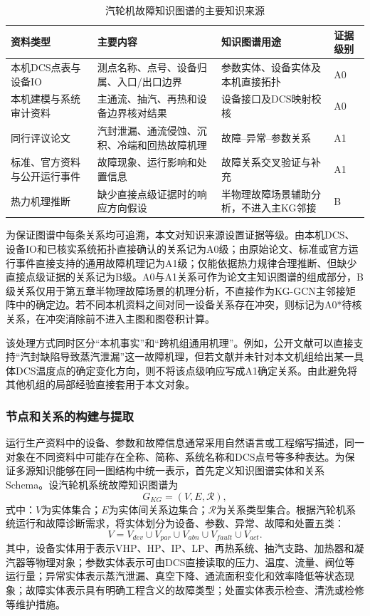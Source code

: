 \begin{table}[htbp]
    \centering
    \caption{汽轮机故障知识图谱的主要知识来源}
    \label{tab:kg_sources_v5}
    \begin{tabular}{p{3.3cm}p{5.0cm}p{4.6cm}p{1.6cm}}
        \toprule
        资料类型 & 主要内容 & 知识图谱用途 & 证据级别 \\
        \midrule
        本机DCS点表与设备IO & 测点名称、点号、设备归属、入口/出口边界 & 参数实体、设备实体及本机直接拓扑 & A0 \\
        本机建模与系统审计资料 & 主通流、抽汽、再热和设备边界核对结果 & 设备接口及DCS映射校核 & A0 \\
        同行评议论文 & 汽封泄漏、通流侵蚀、沉积、冷端和回热故障机理 & 故障--异常--参数关系 & A1 \\
        标准、官方资料与公开运行事件 & 故障现象、运行影响和处置信息 & 故障关系交叉验证与补充 & A1 \\
        热力机理推断 & 缺少直接点级证据时的响应方向假设 & 半物理故障场景辅助分析，不进入主KG邻接 & B \\
        \bottomrule
    \end{tabular}
\end{table}

为保证图谱中每条关系均可追溯，本文对知识来源设置证据等级。由本机DCS、设备IO和已核实系统拓扑直接确认的关系记为A0级；由原始论文、标准或官方运行事件直接支持的通用故障机理记为A1级；仅能依据热力规律合理推断、但缺少直接点级证据的关系记为B级。A0与A1关系可作为论文主知识图谱的组成部分，B级关系仅用于第五章半物理故障场景的机理分析，不直接作为KG-GCN主邻接矩阵中的确定边。若不同本机资料之间对同一设备关系存在冲突，则标记为A0*待核关系，在冲突消除前不进入主图和图卷积计算。

该处理方式同时区分“本机事实”和“跨机组通用机理”。例如，公开文献可以直接支持“汽封缺陷导致蒸汽泄漏”这一故障机理，但若文献并未针对本文机组给出某一具体DCS温度点的确定变化方向，则不将该点级响应写成A1确定关系。由此避免将其他机组的局部经验直接套用于本文对象。

\subsubsection{节点和关系的构建与提取}
\label{subsubsec:entity_relation_v5}

运行生产资料中的设备、参数和故障信息通常采用自然语言或工程缩写描述，同一对象在不同资料中可能存在全称、简称、系统名称和DCS点号等多种表达。为保证多源知识能够在同一图结构中统一表示，首先定义知识图谱实体和关系Schema。设汽轮机系统故障知识图谱为
\begin{equation}
G_{KG}=(V,E,\mathcal R),
\end{equation}
式中：$V$为实体集合；$E$为实体间关系边集合；$\mathcal R$为关系类型集合。根据汽轮机系统运行和故障诊断需求，将实体划分为设备、参数、异常、故障和处置五类：
\begin{equation}
V=V_{dev}\cup V_{par}\cup V_{abn}\cup V_{fault}\cup V_{act} .
\end{equation}
其中，设备实体用于表示VHP、HP、IP、LP、再热系统、抽汽支路、加热器和凝汽器等物理对象；参数实体表示可由DCS直接读取的压力、温度、流量、阀位等运行量；异常实体表示蒸汽泄漏、真空下降、通流面积变化和效率降低等状态现象；故障实体表示具有明确工程含义的故障类型；处置实体表示检查、清洗或检修等维护措施。

